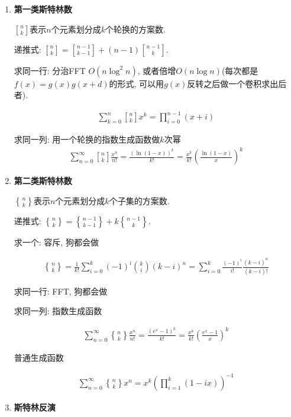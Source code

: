 \begin{enumerate}

\item \textbf{第一类斯特林数}

$n\brack k$表示$n$个元素划分成$k$个轮换的方案数.

递推式: ${n \brack k} = {n-1 \brack k-1} + (n-1){n-1 \brack k}$.

求同一行: 分治FFT $O(n\log ^2 n)$, 或者倍增$O(n\log n)$(每次都是$f(x) = g(x) g(x + d)$的形式, 可以用$g(x)$反转之后做一个卷积求出后者).

$$ \begin{aligned} \sum_{k = 0} ^ n {n \brack k} x^k = \prod_{i = 0} ^ {n - 1} (x + i) \end{aligned} $$

求同一列: 用一个轮换的指数生成函数做$k$次幂
$$\begin{aligned} \sum_{n = 0} ^ \infty {n \brack k} \frac {x ^ n} {n!} = \frac {\left(\ln (1 - x)\right) ^ k} {k!} = \frac {x ^ k} {k!} \left( \frac {\ln (1 - x)} x \right) ^ k \end{aligned}$$

\item \textbf{第二类斯特林数}

$n\brace k$表示$n$个元素划分成$k$个子集的方案数.

递推式: ${n \brace k} = {n-1 \brace k-1} + k{n-1 \brace k}$.

求一个: 容斥, 狗都会做

$$\begin{aligned} {n \brace k} = \frac 1 {k!} \sum_{i = 0} ^ k (-1) ^ i {k \choose i} (k - i) ^ n = \sum_{i = 0} ^ k \frac {(-1) ^ i} {i!} \frac {(k - i) ^ n} {(k - i)!} \end{aligned}$$

求同一行: FFT, 狗都会做

求同一列: 指数生成函数

$$\begin{aligned} \sum_{n = 0} ^ \infty {n \brace k} \frac {x ^ n} {n!} = \frac {\left(e ^ x - 1\right) ^ k} {k!} = \frac {x ^ k} {k!} \left( \frac {e ^ x - 1} x \right) ^ k \end{aligned}$$

普通生成函数

$$\begin{aligned} \sum_{n = 0} ^ \infty {n \brace k} x ^ n = x ^ k \left(\prod_{i = 1} ^ k (1 - i x)\right) ^ {-1} \end{aligned}$$

\item \textbf{斯特林反演}


\end{enumerate}
